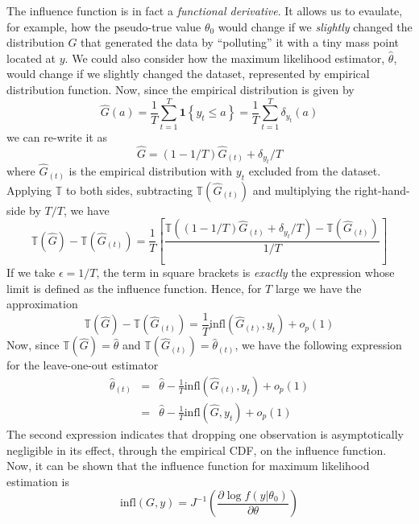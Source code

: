 \documentclass[12pt]{article}
\theoremstyle{definition}
\begin{document}
The influence function is in fact a \emph{functional derivative}. It allows us to evaulate, for example, how the pseudo-true value $\theta_0$  would change if we \emph{slightly} changed the distribution $G$ that generated the data by ``polluting'' it with a tiny mass point located at $y$. We could also consider how the maximum likelihood estimator, $\widehat{\theta}$, would change if we slightly changed the dataset, represented by empirical distribution function. 
Now, since the empirical distribution is given by
$$\widehat{G}(a) = \frac{1}{T}\sum_{t=1}^T \textbf{1}\left\{y_t \leq a\right\} = \frac{1}{T}\sum_{t=1}^T \delta_{y_t}(a)$$
we can re-write it as 
$$\widehat{G} = (1 - 1/T) \widehat{G}_{(t)} + \delta_{y_t}/T$$
where $\widehat{G}_{(t)}$ is the empirical distribution with $y_t$ excluded from the dataset. Applying $\mathbb{T}$ to both sides, subtracting $\mathbb{T}(\widehat{G}_{(t)})$ and multiplying the right-hand-side by $T/T$, we have
	$$\mathbb{T}(\widehat{G}) - \mathbb{T}(\widehat{G}_{(t)}) = \frac{1}{T}\left[\frac{\mathbb{T}\left((1 - 1/T) \widehat{G}_{(t)} + \delta_{y_t}/T \right) - \mathbb{T}(\widehat{G}_{(t)})}{1/T} \right]$$
If we take $\epsilon = 1/T$, the term in square brackets is \emph{exactly} the expression whose limit is defined as the influence function. Hence, for $T$ large we have the approximation
$$\mathbb{T}(\widehat{G}) - \mathbb{T}(\widehat{G}_{(t)}) = \frac{1}{T} \mbox{infl}\left(\widehat{G}_{(t)}, y_t \right) + o_p(1)$$
Now, since $\mathbb{T}(\widehat{G}) = \widehat{\theta}$ and $\mathbb{T}(\widehat{G}_{(t)}) =\widehat{\theta}_{(t)}$, we have the following expression for the leave-one-out estimator
\begin{eqnarray*}
	\widehat{\theta}_{(t)} &=& \widehat{\theta} - \frac{1}{T} \mbox{infl}\left(\widehat{G}_{(t)}, y_t\right) + o_p(1)\\
	&=& \widehat{\theta} - \frac{1}{T} \mbox{infl}\left(\widehat{G}, y_t\right) + o_p(1)
\end{eqnarray*}
The second expression indicates that dropping one observation is asymptotically negligible in its effect, through the empirical CDF, on the influence function. Now, it can be shown that the influence function for maximum likelihood estimation is
	$$\mbox{infl}(G,y) = J^{-1} \left(\frac{\partial \log f(y|\theta_0)}{\partial \theta}\right)$$
\end{document}
